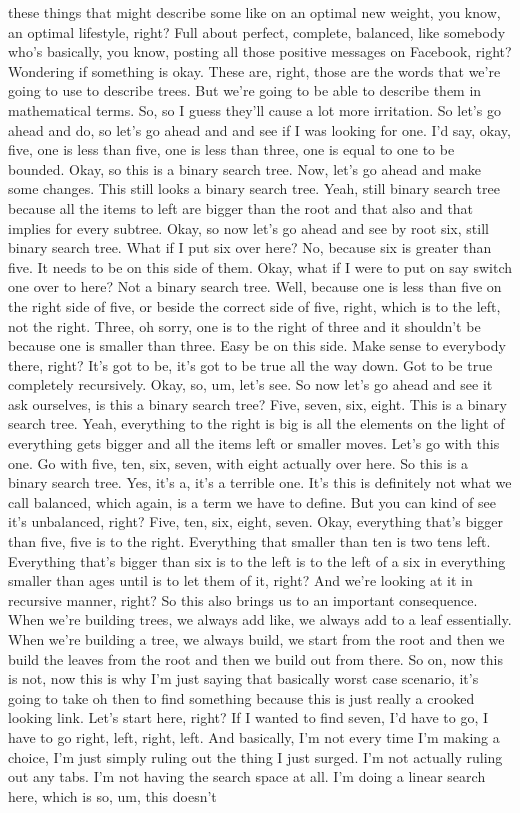 these things that might describe some like on an optimal new weight, you know, an optimal lifestyle, right? Full about perfect, complete, balanced, like somebody who's basically, you know, posting all those positive messages on Facebook, right? Wondering if something is okay. These are, right, those are the words that we're going to use to describe trees. But we're going to be able to describe them in mathematical terms. So, so I guess they'll cause a lot more irritation. So let's go ahead and do, so let's go ahead and and see if I was looking for one. I'd say, okay, five, one is less than five, one is less than three, one is equal to one to be bounded. Okay, so this is a binary search tree. Now, let's go ahead and make some changes. This still looks a binary search tree. Yeah, still binary search tree because all the items to left are bigger than the root and that also and that implies for every subtree. Okay, so now let's go ahead and see by root six, still binary search tree. What if I put six over here? No, because six is greater than five. It needs to be on this side of them. Okay, what if I were to put on say switch one over to here? Not a binary search tree. Well, because one is less than five on the right side of five, or beside the correct side of five, right, which is to the left, not the right. Three, oh sorry, one is to the right of three and it shouldn't be because one is smaller than three. Easy be on this side. Make sense to everybody there, right? It's got to be, it's got to be true all the way down. Got to be true completely recursively. Okay, so, um, let's see. So now let's go ahead and see it ask ourselves, is this a binary search tree? Five, seven, six, eight. This is a binary search tree. Yeah, everything to the right is big is all the elements on the light of everything gets bigger and all the items left or smaller moves. Let's go with this one. Go with five, ten, six, seven, with eight actually over here. So this is a binary search tree. Yes, it's a, it's a terrible one. It's this is definitely not what we call balanced, which again, is a term we have to define. But you can kind of see it's unbalanced, right? Five, ten, six, eight, seven. Okay, everything that's bigger than five, five is to the right. Everything that smaller than ten is two tens left. Everything that's bigger than six is to the left is to the left of a six in everything smaller than ages until is to let them of it, right? And we're looking at it in recursive manner, right? So this also brings us to an important consequence. When we're building trees, we always add like, we always add to a leaf essentially. When we're building a tree, we always build, we start from the root and then we build the leaves from the root and then we build out from there. So on, now this is not, now this is why I'm just saying that basically worst case scenario, it's going to take oh then to find something because this is just really a crooked looking link. Let's start here, right? If I wanted to find seven, I'd have to go, I have to go right, left, right, left. And basically, I'm not every time I'm making a choice, I'm just simply ruling out the thing I just surged. I'm not actually ruling out any tabs. I'm not having the search space at all. I'm doing a linear search here, which is so, um, this doesn't 